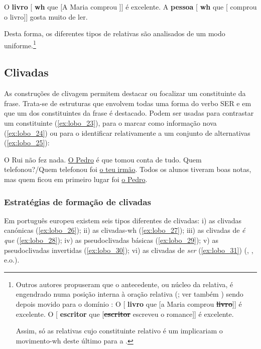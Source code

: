 \documentclass[output=paper]{LSP/langsci}
\begin{document}
\ea\label{ex:lobo_21} O \textbf{livro} [\textsubscript{} \linkto \textbf{wh} \under que [A Maria comprou \from \underline{\hspace{1em}}]] é excelente.\z
\ea\label{ex:lobo_22} A \textbf{pessoa} [\textsubscript{} \linkto \textbf{wh} \under que [\from \underline{\hspace{1em}} comprou o livro]] gosta muito de ler.\z

Desta forma, os diferentes tipos de relativas são analisados de um modo uniforme.\footnote{
Outros autores propuseram que o antecedente, ou núcleo da relativa, é engendrado numa posição interna à oração relativa (\citealt{brame1968,schachter1973,vergnaud1974}; ver também \citealt{kayne1994}) sendo depois movido para o domínio :
\ea\label{ex:lobo_i2}
\ea\label{ex:lobo_i2a} O [\textsubscript{} \textbf{livro} que [a Maria comprou \sout{\textbf{livro}}]] é excelente.
\ex\label{ex:lobo_i2b} O [\textsubscript{} \textbf{escritor} que [\sout{\textbf{escritor}} escreveu o romance]] é excelente.
\zl

Assim, só as relativas cujo constituinte relativo é um  implicariam o movimento-wh deste último para a .}

\subsection{Clivadas}
\label{subsec:lobo_clivadas}
As construções de clivagem permitem destacar ou focalizar um constituinte da frase. Trata-se de estruturas que envolvem todas uma forma do verbo SER e em que um dos constituintes da frase é destacado. Podem ser usadas para contrastar um constituinte (\ref{ex:lobo_23}), para o marcar como informação nova (\ref{ex:lobo_24}) ou para o identificar relativamente a um conjunto de alternativas (\ref{ex:lobo_25}):

\ea\label{ex:lobo_23} O Rui não fez nada. \underline{O Pedro} é que tomou conta de tudo.\z
\ea\label{ex:lobo_24} Quem telefonou?/Quem telefonou foi \underline{o teu irmão}.\z
\ea\label{ex:lobo_25} Todos os alunos tiveram boas notas, mas quem ficou em primeiro lugar foi \underline{o Pedro}.\z


\subsubsection{Estratégias de formação de clivadas}
\label{subsubsec:lobo_estrategias_form_cliv}
Em português europeu existem seis tipos diferentes de clivadas:  i) as clivadas canónicas (\ref{ex:lobo_26}); ii) as clivadas-wh (\ref{ex:lobo_27}); iii) as clivadas de \textit{é que} (\ref{ex:lobo_28}); iv) as pseudoclivadas básicas (\ref{ex:lobo_29}); v) as pseudoclivadas invertidas (\ref{ex:lobo_30}); vi) as clivadas de \textit{ser} (\ref{ex:lobo_31}) (\citealt{malacacasteleiro1979}, \citealt{costaduarte2001}, e.o.).
\end{document}
